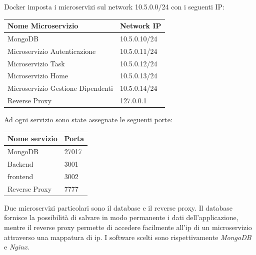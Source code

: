\documentclass{report}
\begin{document}
Docker imposta i microservizi sul network 10.5.0.0/24 con i seguenti IP:
\begin{center} %
	\centering
	\begin{tabular}{ |p{4cm}|p{4cm}|  }
		\hline
		\centering Nome Microservizio & \qquad\quad Network IP \\ %
		\hline
		MongoDB & 10.5.0.10/24 \\
		\hline
		Microservizio Autenticazione & 10.5.0.11/24 \\
		\hline
		Microservizio Task & 10.5.0.12/24 \\
		\hline
		Microservizio Home & 10.5.0.13/24 \\
		\hline
		Microservizio Gestione Dipendenti & 10.5.0.14/24 \\
		\hline
		Reverse Proxy & 127.0.0.1 \\
		\hline
	\end{tabular}
\end{center}

Ad ogni servizio sono state assegnate le seguenti porte:

\begin{center} %
	\centering
	\begin{tabular}{ |p{4cm}|p{4cm}|  }
		\hline
		\centering Nome servizio & \qquad\qquad Porta \\ %
		\hline
		MongoDB & 27017 \\
		\hline
		Backend & 3001 \\
		\hline
		frontend & 3002 \\
		\hline
		Reverse Proxy & 7777 \\
		\hline
	\end{tabular}
\end{center}

Due microservizi particolari sono il database e il reverse proxy. Il database fornisce la possibilità di salvare in modo permanente i dati dell'applicazione, mentre il reverse proxy permette di accedere facilmente all'ip di un microservizio attraverso una mappatura di ip. I software scelti sono rispettivamente \textit{MongoDB} e \textit{Nginx}.
\end{document}
